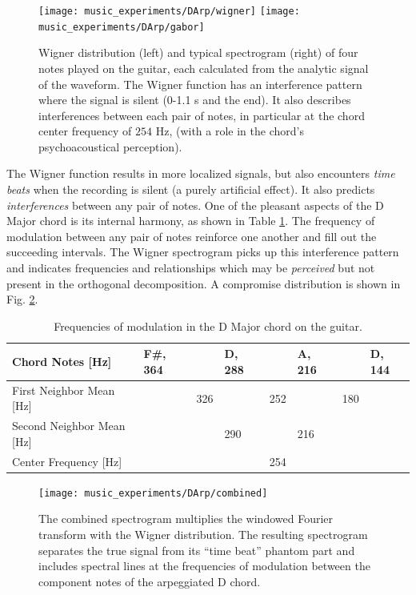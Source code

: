 \documentclass{article}
\begin{document}
\begin{appendices}
\begin{figure}[t!]
  \centering
  \texttt{[image: music\_experiments/DArp/wigner]}
  \texttt{[image: music\_experiments/DArp/gabor]}
  \caption{Wigner distribution (left) and typical spectrogram (right) of four notes played on the guitar, each calculated from the analytic signal of the waveform. The Wigner function has an interference pattern where the signal is silent (0-1.1 s and the end). It also describes interferences between each pair of notes, in particular at the chord center frequency of $254$ Hz, (with a role in the chord's psychoacoustical perception).}\label{wig_gabor}
\end{figure}

The Wigner function results in more localized signals, but also encounters \textit{time beats} when the recording is silent (a purely artificial effect). It also predicts \textit{interferences} between any pair of notes. One of the pleasant aspects of the D Major chord is its internal harmony, as shown in Table \ref{DChord}. The frequency of modulation between any pair of notes reinforce one another and fill out the succeeding intervals. The Wigner spectrogram picks up this interference pattern and indicates frequencies and relationships which may be \textit{perceived} but not present in the orthogonal decomposition. A compromise distribution is shown in Fig. \ref{wig_gabor}.

\begin{table}[h]
  \centering
\begin{tabular}{|l|l|l|l|l|l|l|l|}
\hline
Chord Notes {[}Hz{]}          & F\#, 364 &     & D, 288 &     & A, 216 &     & D, 144 \\ \hline
First Neighbor Mean {[}Hz{]}  &           & 326 &         & 252 &         & 180 &         \\ \hline
Second Neighbor Mean {[}Hz{]} &           &     & 290     &     & 216     &     &         \\ \hline
Center Frequency {[}Hz{]}     &           &     &         & 254 &         &     &         \\ \hline
\end{tabular}
\caption{Frequencies of modulation in the D Major chord on the guitar.}\label{DChord}
\end{table}

\begin{figure}[hb!]
  \centering
  \texttt{[image: music\_experiments/DArp/combined]}
  \caption{The combined spectrogram multiplies the windowed Fourier transform with the Wigner distribution. The resulting spectrogram separates the true signal from its ``time beat'' phantom part and includes spectral lines at the frequencies of modulation between the component notes of the arpeggiated D chord.}\label{wig_gabor}
\end{figure}


\end{appendices}
\end{document}

